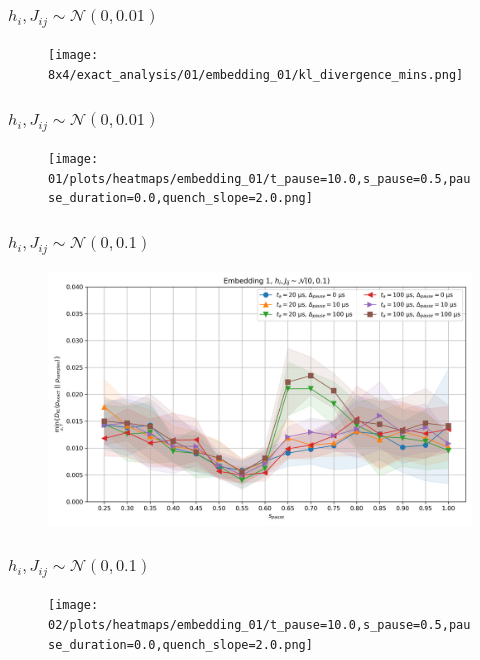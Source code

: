 \documentclass{beamer}
\begin{document}
\begin{frame}
    \frametitle{\( h_i, J_{ij} \sim \mathcal{N}(0, 0.01) \)}
    \begin{figure}
        \texttt{[image: 8x4/exact\_analysis/01/embedding\_01/kl\_divergence\_mins.png]}
    \end{figure}
\end{frame}
\begin{frame}
    \frametitle{\( h_i, J_{ij} \sim \mathcal{N}(0, 0.01) \)}
    \begin{figure}
        \texttt{[image: 01/plots/heatmaps/embedding\_01/t\_pause=10.0,s\_pause=0.5,pause\_duration=0.0,quench\_slope=2.0.png]}
    \end{figure}
\end{frame}

\begin{frame}
    \frametitle{\( h_i, J_{ij} \sim \mathcal{N}(0, 0.1) \)}
    \begin{figure}
        \includegraphics[width=1\linewidth]{8x4/exact_analysis/02/embedding_01/kl_divergence_mins.png}
    \end{figure}
\end{frame}
\begin{frame}
    \frametitle{\( h_i, J_{ij} \sim \mathcal{N}(0, 0.1) \)}
    \begin{figure}
        \texttt{[image: 02/plots/heatmaps/embedding\_01/t\_pause=10.0,s\_pause=0.5,pause\_duration=0.0,quench\_slope=2.0.png]}
    \end{figure}
\end{frame}
\end{document}
